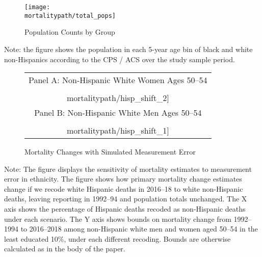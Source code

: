 \begin{figure}[H]
  \caption{Population Counts by Group}
  \label{fig:pops}
  \begin{center}
    \texttt{[image: \\mortalitypath/total\_pops]} \\
  \end{center}
\end{figure}
\scriptsize{Note: the figure shows the population in each 5-year age bin of black and white non-Hispanics according to the CPS / ACS over the study sample period.}

\begin{figure}[H]
  \caption{Mortality Changes with Simulated Measurement Error}
  \label{fig:hisp_changes}
  \begin{center}
    \begin{tabular}{c}
      \small{Panel A: Non-Hispanic White Women Ages 50--54} \\ \texttt{[image: \\mortalitypath/hisp\_shift\_2]} \\
      \small{Panel B: Non-Hispanic White Men Ages 50--54} \\ \texttt{[image: \\mortalitypath/hisp\_shift\_1]}
    \end{tabular}
  \end{center}
\end{figure}
\scriptsize{Note: The figure displays the sensitivity of mortality estimates to measurement error in ethnicity. The figure shows how primary mortality change estimates change if we recode white Hispanic deaths in 2016--18 to white non-Hispanic deaths, leaving reporting in 1992--94 and population totals unchanged. The X axis shows the percentage of Hispanic deaths recoded as non-Hispanic deaths under each scenario. The Y axis shows bounds on mortality change from 1992--1994 to 2016--2018 among non-Hispanic white men and women aged 50--54 in the least educated 10\%, under each different recoding. Bounds are otherwise calculated as in the body of the paper.}
